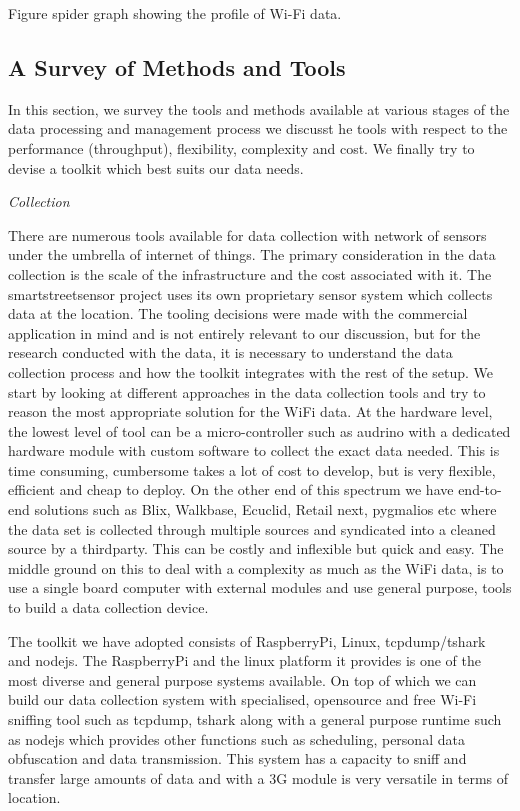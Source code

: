 Figure spider graph showing the profile of Wi-Fi data.


\subsection{A Survey of Methods and Tools}

In this section, we survey the tools and methods available at various stages of the data processing and management process we discusst he tools with respect to the performance (throughput), flexibility, complexity and cost.
We finally try to devise a toolkit which best suits our data needs.


\textit{Collection}

There are numerous tools available for data collection with network of sensors under the umbrella of internet of things.
The primary consideration in the data collection is the scale of the infrastructure and the cost associated with it.
The smartstreetsensor project uses its own proprietary sensor system which collects data at the location.
The tooling decisions were made with the commercial application in mind and is not entirely relevant to our discussion, but for the research conducted with the data, it is necessary to understand the data collection process and how the toolkit integrates with the rest of the setup.
We start by looking at different approaches in the data collection tools and try to reason the most appropriate solution for the WiFi data.
At the hardware level, the lowest level of tool can be a micro-controller such as audrino with a dedicated hardware module with custom software to collect the exact data needed.
This is time consuming, cumbersome takes a lot of cost to develop, but is very flexible, efficient and cheap to deploy.
On the other end of this spectrum we have end-to-end solutions such as Blix, Walkbase, Ecuclid, Retail next, pygmalios etc where the data set is collected through multiple sources and syndicated into a cleaned source by a thirdparty.
This can be costly and inflexible but quick and easy.
The middle ground on this to deal with a complexity as much as the WiFi data, is to use a single board computer with external modules and use general purpose, tools to build a data collection device.

The toolkit we have adopted consists of RaspberryPi, Linux, tcpdump/tshark and nodejs.
The RaspberryPi and the linux platform it provides is one of the most diverse and general purpose systems available.
On top of which we can build our data collection system with specialised, opensource and free Wi-Fi sniffing tool such as tcpdump, tshark along with a general purpose runtime such as nodejs which provides other functions such as scheduling, personal data obfuscation and data transmission.
This system has a capacity to sniff and transfer large amounts of data and with a 3G module is very versatile in terms of location.

